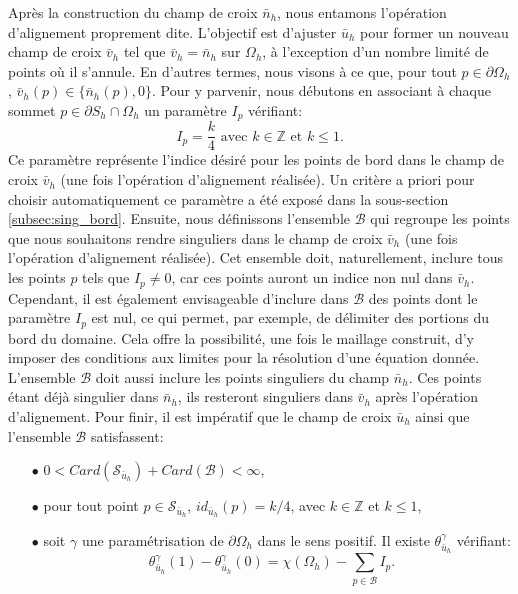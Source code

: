 Après la construction du champ de croix $\bar{n}_h$, nous entamons l'opération d'alignement proprement dite. L'objectif est d'ajuster $\bar{u}_h$ pour former un nouveau champ de croix $\bar{v}_h$ tel que $\bar{v}_h=\bar{n}_h$ sur $\Omega_h$, à l'exception d'un nombre limité de points où il s'annule. En d'autres termes, nous visons à ce que, pour tout $p\in\partial\Omega_h$, $\bar{v}_h(p)\in\{\bar{n}_h(p), 0\}$. Pour y parvenir, nous débutons en associant à chaque sommet $p\in\partial S_h\cap\Omega_h$ un paramètre $I_p$ vérifiant:
\begin{equation}
I_p=\displaystyle\frac{k}{4}\mbox{ avec }k\in\mathbb{Z}\mbox{ et }k\leq 1.
\end{equation}
Ce paramètre représente l'indice désiré pour les points de bord dans le champ de croix $\bar{v}_h$ (une fois l'opération d'alignement réalisée). Un critère a priori pour choisir automatiquement ce paramètre a été exposé dans la sous-section \ref{subsec:sing_bord}. Ensuite, nous définissons l'ensemble $\mathcal{B}$ qui regroupe les points que nous souhaitons rendre singuliers dans le champ de croix $\bar{v}_h$ (une fois l'opération d'alignement réalisée). Cet ensemble doit, naturellement, inclure tous les points $p$ tels que $I_p\neq 0$, car ces points auront un indice non nul dans $\bar{v}_h$. Cependant, il est également envisageable d'inclure dans $\mathcal{B}$ des points dont le paramètre $I_p$ est nul, ce qui permet, par exemple, de délimiter des portions du bord du domaine. Cela offre la possibilité, une fois le maillage construit, d'y imposer des conditions aux limites pour la résolution d'une équation donnée. L'ensemble $\mathcal{B}$ doit aussi inclure les points singuliers du champ $\bar{n}_h$. Ces points étant déjà singulier dans $\bar{n}_h$, ils resteront singuliers dans $\bar{v}_h$ après l'opération d'alignement. Pour finir, il est impératif que le champ de croix $\bar{u}_h$ ainsi que l'ensemble $\mathcal{B}$ satisfassent:\\
\begin{itemize}
 \item[$\bullet$] $0< Card(\mathcal{S}_{\bar{u}_h})+Card(\mathcal{B}) <\infty$,\\
 \item[$\bullet$] pour tout point $p\in\mathcal{S}_{\bar{u}_h}$, $id_{\bar{u}_h}(p)=k/4$, avec $k\in\mathbb{Z}$ et $k\leq 1$,\\
 \item[$\bullet$] soit $\gamma$ une paramétrisation de $\partial\Omega_h$ dans le sens positif. Il existe $\theta_{\bar{u}_h}^\gamma$ vérifiant:
 \begin{equation}
    \label{eqn:etude_hyp_u_simple}
    \theta_{\bar{u}_h}^\gamma(1)-\theta_{\bar{u}_h}^\gamma(0)=\chi(\Omega_h)-\sum_{p\in\mathcal{B}}I_p.
\end{equation}
\end{itemize}
